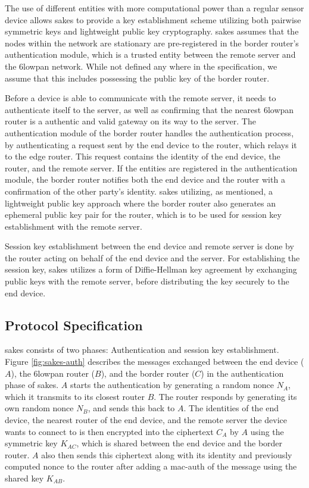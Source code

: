 The use of different entities with more computational power than a regular sensor device allows \gls{sakes} to provide a key establishment scheme utilizing both pairwise symmetric keys and lightweight public key cryptography. \gls{sakes} assumes that the nodes within the network are stationary are pre-registered in the border router's authentication module, which is a trusted entity between the remote server and the \gls{6lowpan} network. While not defined any where in the specification, we assume that this includes possessing the public key of the border router. 

Before a device is able to communicate with the remote server, it needs to authenticate itself to the server, as well as confirming that the nearest \gls{6lowpan} router is a authentic and valid gateway on its way to the server. The authentication module of the border router handles the authentication process, by authenticating a request sent by the end device to the router, which relays it to the edge router. This request contains the identity of the end device, the router, and the remote server. If the entities are registered in the authentication module, the border router notifies both the end device and the router with a confirmation of the other party's identity. \gls{sakes} utilizing, as mentioned, a lightweight public key approach where the border router also generates an ephemeral public key pair for the router, which is to be used for session key establishment with the remote server.

Session key establishment between the end device and remote server is done by the router acting on behalf of the end device and the server. For establishing the session key, \gls{sakes} utilizes a form of Diffie-Hellman key agreement by exchanging public keys with the remote server, before distributing the key securely to the end device.




\subsection{Protocol Specification}
\label{subsec:sakes-spec}

\gls{sakes} consists of two phases: Authentication and session key establishment. Figure \ref{fig:sakes-auth} describes the messages exchanged between the end device ($A$), the \gls{6lowpan} router ($B$), and the border router ($C$) in the authentication phase of \gls{sakes}. $A$ starts the authentication by generating a random nonce $N_A$, which it transmits to its closest router $B$. The router responds by generating its own random nonce $N_B$, and sends this back to $A$. The identities of the end device, the nearest router of the end device, and the remote server the device wants to connect to is then encrypted into the ciphertext $C_A$ by $A$ using the symmetric key $K_{AC}$, which is shared between the end device and the border router. $A$ also then sends this ciphertext along with its identity and previously computed nonce to the router after adding a \gls{mac-auth} of the message using the shared key $K_{AB}$.

